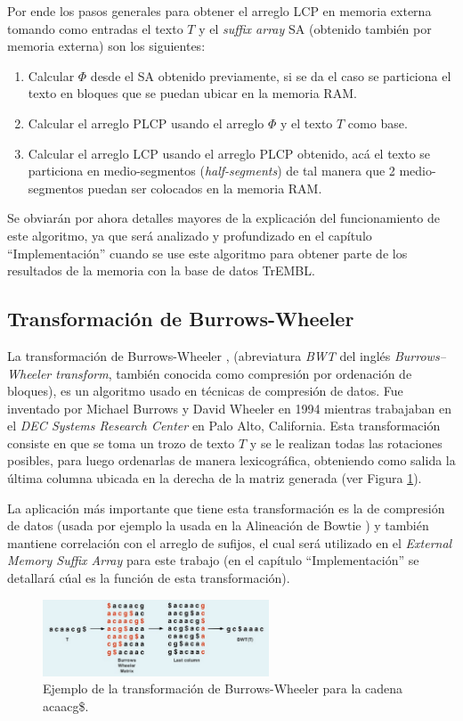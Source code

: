 Por ende los pasos generales para obtener el arreglo LCP en memoria externa tomando como entradas el texto $T$ y el \textit{suffix array} SA (obtenido también por memoria externa) son los siguientes:

\begin{enumerate}

\item Calcular $\Phi$ desde el SA obtenido previamente, si se da el caso se particiona el texto en bloques que se puedan ubicar en la memoria RAM.
\item Calcular el arreglo PLCP usando el arreglo $\Phi$ y el texto $T$ como base.
\item Calcular el arreglo LCP usando el arreglo PLCP obtenido, acá el texto se particiona en medio-segmentos (\textit{half-segments}) de tal manera que 2 medio-segmentos puedan ser colocados en la memoria RAM.

\end{enumerate}

Se obviarán por ahora detalles mayores de la explicación del funcionamiento de este algoritmo, ya que será analizado y profundizado en el capítulo ``Implementación'' cuando se use este algoritmo para obtener parte de los resultados de la memoria con la base de datos TrEMBL.

\subsection{Transformación de Burrows-Wheeler}

La transformación de Burrows-Wheeler \cite{bwt}, (abreviatura \textit{BWT} del inglés \textit{Burrows–Wheeler transform}, también conocida como compresión por ordenación de bloques), es un algoritmo usado en técnicas de compresión de datos. Fue inventado por Michael Burrows y David Wheeler en 1994 mientras trabajaban en el \textit{DEC Systems Research Center} en Palo Alto, California. Esta transformación consiste en que se toma un trozo de texto $T$ y se le realizan todas las rotaciones posibles, para luego ordenarlas de manera lexicográfica, obteniendo como salida la última columna ubicada en la derecha de la matriz generada (ver Figura \ref{fig:comb3}).

La aplicación más importante que tiene esta transformación es la de compresión de datos (usada por ejemplo la usada en la Alineación de Bowtie \cite{bowtie}) y también mantiene correlación con el arreglo de sufijos, el cual será utilizado en el \textit{External Memory Suffix Array} para este trabajo (en el capítulo ``Implementación'' se detallará cúal es la función de esta transformación).

\begin{figure}[h]
    \centering
    \includegraphics[width=0.6\textwidth]{./images/bwtejemplo.png}
    \caption{Ejemplo de la transformación de Burrows-Wheeler para la cadena acaacg\$.}
    \label{fig:comb3}
\end{figure}